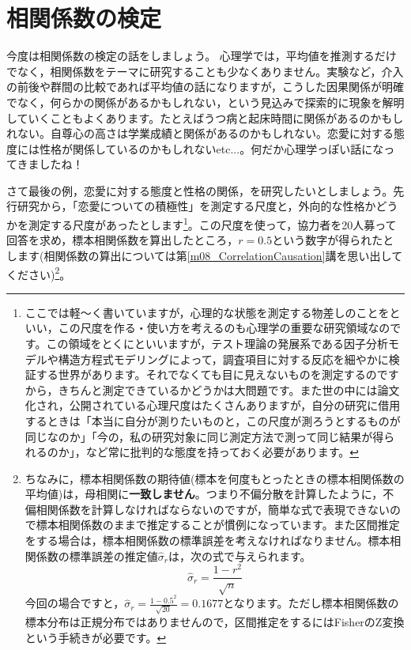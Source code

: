 \documentclass{ltjsbook}
\begin{document}
\section{相関係数の検定}
今度は相関係数の検定の話をしましょう。
心理学では，平均値を推測するだけでなく，相関係数をテーマに研究することも少なくありません。実験など，介入の前後や群間の比較であれば平均値の話になりますが，こうした因果関係が明確でなく，何らかの関係があるかもしれない，という見込みで探索的に現象を解明していくこともよくあります。たとえばうつ病と起床時間に関係があるのかもしれない。自尊心の高さは学業成績と関係があるのかもしれない。恋愛に対する態度には性格が関係しているのかもしれないetc...。何だか心理学っぽい話になってきましたね！

さて最後の例，恋愛に対する態度と性格の関係，を研究したいとしましょう。先行研究から，「恋愛についての積極性」を測定する尺度と，外向的な性格かどうかを測定する尺度があったとします\footnote{ここでは軽〜く書いていますが，心理的な状態を測定する物差しのことをといい，この尺度を作る・使い方を考えるのも心理学の重要な研究領域なのです。この領域をとくにといいますが，テスト理論の発展系である因子分析モデルや構造方程式モデリングによって，調査項目に対する反応を細やかに検証する世界があります。それでなくても目に見えないものを測定するのですから，きちんと測定できているかどうかは大問題です。また世の中には論文化され，公開されている心理尺度はたくさんありますが，自分の研究に借用するときは「本当に自分が測りたいものと，この尺度が測ろうとするものが同じなのか」「今の，私の研究対象に同じ測定方法で測って同じ結果が得られるのか」，など常に批判的な態度を持っておく必要があります。}。この尺度を使って，協力者を20人募って回答を求め，標本相関係数を算出したところ，$r=0.5$という数字が得られたとします(相関係数の算出については第\ref{m08_CorrelationCausation}講を思い出してください)\footnote{ちなみに，標本相関係数の期待値(標本を何度もとったときの標本相関係数の平均値)は，母相関に\textbf{一致しません}。つまり不偏分散を計算したように，不偏相関係数を計算しなければならないのですが，簡単な式で表現できないので標本相関係数のままで推定することが慣例になっています\parencite{Haebara200206,Hirakawa2021}。また区間推定をする場合は，標本相関係数の標準誤差を考えなければなりません。標本相関係数の標準誤差の推定値$\hat{\sigma}_r$は，次の式で与えられます。
	$$\hat{\sigma}_r= \frac{1-r^2}{\sqrt{n}}$$
	今回の場合ですと，$\hat{\sigma}_r = \frac{1-0.5^2}{\sqrt{20} }= 0.1677$となります。ただし標本相関係数の標本分布は正規分布ではありませんので，区間推定をするにはFisherのZ変換という手続きが必要です。}。
\end{document}

